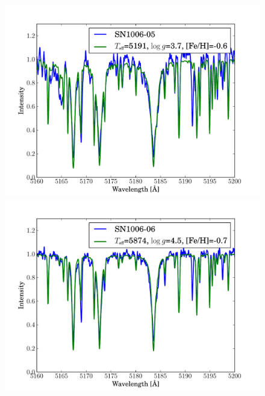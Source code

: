 \begin{figure}[tb]
   \label{fig:sn1006_candfit}
\end{figure}\begin{figure}[tb] %
   \centering
\includegraphics[width=1.1\textwidth, trim=0 0mm 0 10mm, clip]{chapter_sn1006/plots/gold_spectra/sn1006_05.pdf}
\includegraphics[width=1.1\textwidth, trim=0 0mm 0 10mm, clip]{chapter_sn1006/plots/gold_spectra/sn1006_06.pdf}


\end{figure}
